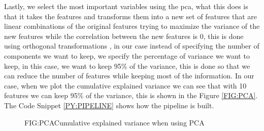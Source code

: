 Lastly, we select the most important variables using the \ac{pca}, what this does is that it takes the features and transforms them into a new set of features that are linear combinations of the original features trying to maximize the variance of the new features while the correlation between the new features is 0, this is done using orthogonal transformations \cite{daffertshofer_pca_2004}, in our case instead of specifying the number of components we want to keep, we specify the percentage of variance we want to keep, in this case, we want to keep 95\% of the variance, this is done so that we can reduce the number of features while keeping most of the information. In our case, when we plot the cumulative explained variance we can see that with 10 features we can keep 95\% of the variance, this is shown in the Figure \ref{FIG:PCA}. The Code Snippet \ref{PY:PIPELINE} shows how the pipeline is built.

\begin{figure}[PCA]{FIG:PCA}{Cumulative explained variance when using PCA}
\end{figure}


